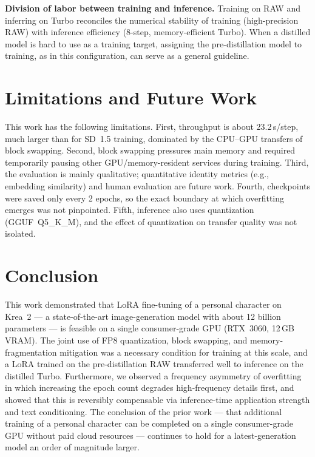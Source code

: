 \documentclass[10pt,twocolumn]{article}
\begin{document}
\textbf{Division of labor between training and inference.} Training on RAW and inferring on Turbo reconciles the numerical stability of training (high-precision RAW) with inference efficiency (8-step, memory-efficient Turbo). When a distilled model is hard to use as a training target, assigning the pre-distillation model to training, as in this configuration, can serve as a general guideline.

\section{Limitations and Future Work}
This work has the following limitations. First, throughput is about 23.2\,s/step, much larger than for SD~1.5 training, dominated by the CPU--GPU transfers of block swapping. Second, block swapping pressures main memory and required temporarily pausing other GPU/memory-resident services during training. Third, the evaluation is mainly qualitative; quantitative identity metrics (e.g., embedding similarity) and human evaluation are future work. Fourth, checkpoints were saved only every 2 epochs, so the exact boundary at which overfitting emerges was not pinpointed. Fifth, inference also uses quantization (GGUF~Q5\_K\_M), and the effect of quantization on transfer quality was not isolated.

\section{Conclusion}
This work demonstrated that LoRA fine-tuning of a personal character on Krea~2 --- a state-of-the-art image-generation model with about 12 billion parameters --- is feasible on a single consumer-grade GPU (RTX~3060, 12\,GB VRAM). The joint use of FP8 quantization, block swapping, and memory-fragmentation mitigation was a necessary condition for training at this scale, and a LoRA trained on the pre-distillation RAW transferred well to inference on the distilled Turbo. Furthermore, we observed a frequency asymmetry of overfitting in which increasing the epoch count degrades high-frequency details first, and showed that this is reversibly compensable via inference-time application strength and text conditioning. The conclusion of the prior work --- that additional training of a personal character can be completed on a single consumer-grade GPU without paid cloud resources --- continues to hold for a latest-generation model an order of magnitude larger.
\end{document}
